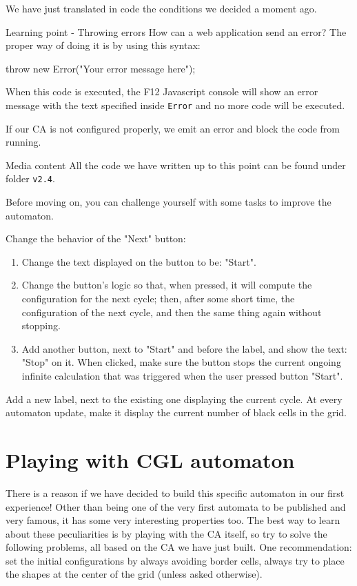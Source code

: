 We have just translated in code the conditions we decided a moment ago.

\begin{tips}{Learning point - Throwing errors}
How can a web application send an error? The proper way of doing it is by using this syntax:
\begin{code}
throw new Error("Your error message here");
\end{code}
When this code is executed, the F12 Javascript console will show an error message with the text
specified inside \texttt{Error} and no more code will be executed.
\end{tips}

If our CA is not configured properly, we emit an error and block the code from running.

\begin{trailer}{Media content}
All the code we have written up to this point can be found under folder \texttt{v2.4}.
\end{trailer}

Before moving on, you can challenge yourself with some tasks to improve the automaton.

\begin{problem}
\label{prob:nextasauto}
Change the behavior of the "Next" button:
\begin{enumerate}
  \item Change the text displayed on the button to be: "Start".
  \item Change the button's logic so that, when pressed, it will compute the configuration for the next cycle;
    then, after some short time, the configuration of the next cycle, and then the same thing again
    without stopping.
  \item Add another button, next to "Start" and before the label, and show the text: "Stop" on it. When clicked,
    make sure the button stops the current ongoing infinite calculation that was
    triggered when the user pressed button "Start".
\end{enumerate}
\end{problem}

\begin{problem}
\label{prob:blackcounter}
Add a new label, next to the existing one displaying the current cycle. At every automaton update, make it display
the current number of black cells in the grid.
\end{problem}

\section{Playing with CGL automaton}
There is a reason if we have decided to build this specific automaton in our first experience!
Other than being one of the very first automata to be published and very famous,
it has some very interesting properties too.
The best way to learn about these peculiarities is by playing with the CA itself, so try to
solve the following problems, all based on the CA we have just built. One recommendation:
set the initial configurations by always avoiding border cells, always try to place
the shapes at the center of the grid (unless asked otherwise).

